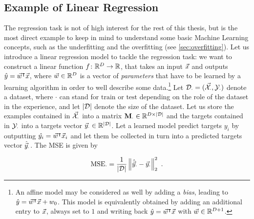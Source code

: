 
\subsection{Example of Linear Regression}
The regression task is not of high interest for the rest of this thesis, but is the most direct example to keep in mind to understand some basic Machine Learning concepts, such as the underfitting and the overfitting (see \ref{sec:overfitting}). Let us introduce a linear regression model to tackle the regression task: we want to construct a linear function $f\colon \mathbb{R}^D \rightarrow \mathbb{R}$, that takes an input $\vec{x}$ and outputs $\hat{y} = \vec{w}^\intercal \vec{x}$, where $\vec{w}\in \mathbb{R}^D$ is a vector of \emph{parameters} that have to be learned by a learning algorithm in order to well describe some data.\footnote{An affine model may be considered as well by adding a \emph{bias}, leading to $\hat{y} = \vec{w}^\intercal \vec{x}+w_0$. This model is equivalently obtained by adding an additional entry to $\vec{x}$, always set to $1$ and writing back $\hat{y} = \vec{w}^\intercal \vec{x}$ with $\vec{w}\in \mathbb{R}^{D+1}$. } 
Let $\mathcal{D}_{\cdot} = (\vec{\mathcal{X}}_{\cdot}, \mathcal{Y}_{\cdot})$ denote a dataset, where $\cdot$ can stand for $\text{train}$ or $\text{test}$ depending on the role of the dataset in the experience, and let $\lvert\mathcal{D}\rvert$ denote the size of the dataset. Let us store the examples contained in $\vec{\mathcal{X}}_{\cdot}$ into a matrix $\textbf{M}_{\cdot}\in \mathbb{R}^{D \times \lvert\mathcal{D}\rvert}$ and the targets contained in $\mathcal{Y}_{\cdot}$ into a targets vector $\vec{y}_{\cdot}\in \mathbb{R}^{\lvert\mathcal{D}\rvert}$. Let a learned model predict targets $y_i$ by outputting $\hat{y_i} = \vec{w}^\intercal\vec{x}_i$ and let them be collected in turn into a predicted targets vector $\hat{\vec{y}}_{\cdot}$. The MSE is given by 

\begin{equation}
 \mathrm{MSE_{\cdot}} = \frac{1}{\lvert\mathcal{D}\rvert} \left\lVert\hat{\vec{y}}_{\cdot}-\vec{y}_{\cdot}\right\rVert^2_2 \mbox{ .}
\end{equation}

